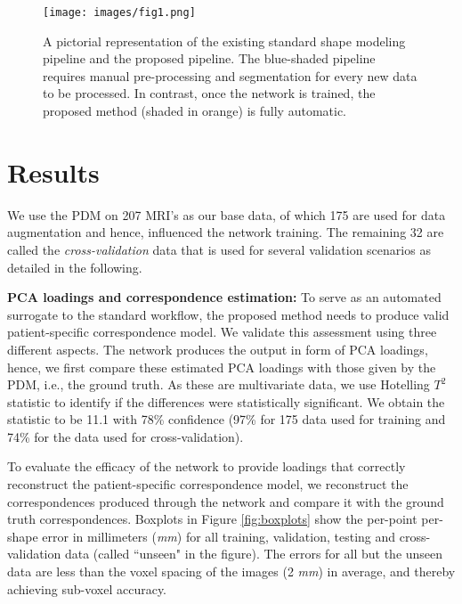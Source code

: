 \documentclass[twocolumn]{cinc}
\begin{document}
\begin{figure}[!h]
\centering
\texttt{[image: images/fig1.png]}
\vspace{-0.1in}
\caption{A pictorial representation of the existing standard shape modeling pipeline and the proposed pipeline. The blue-shaded pipeline requires manual pre-processing and segmentation for every new data to be processed. In contrast, once the network is trained, the proposed method (shaded in orange) is fully automatic.}
\vspace{-0.2in}
\label{fig:trainmodel}
\end{figure}


\vspace{-0.1in}
\section{Results}
\vspace{-0.1in}

We use the PDM on 207 MRI's as our base data, of which 175 are used for data augmentation and hence, influenced the network training. The remaining 32 are called the \emph{cross-validation} data that is used for several validation scenarios as detailed in the following.

\vspace{0.05in}
\noindent\textbf{PCA loadings and correspondence estimation: }
To serve as an automated surrogate to the standard workflow, the proposed method needs to produce valid patient-specific correspondence model. We validate this assessment using three different aspects. The network produces the output in form of PCA loadings, hence, we first compare these estimated PCA loadings with those given by the PDM, i.e., the ground truth. As these are multivariate data, we use Hotelling $T^2$ statistic to identify if the differences were statistically significant. We obtain the statistic to be 11.1 with 78\% confidence (97\% for 175 data used for training and 74\% for the data used for cross-validation). 

To evaluate the efficacy of the network to provide loadings that correctly reconstruct the patient-specific correspondence model, we reconstruct the correspondences produced through the network and compare it with the ground truth correspondences. Boxplots in Figure \ref{fig:boxplots} show the per-point per-shape error in millimeters (\textit{mm}) for all training, validation, testing and cross-validation data (called ``unseen" in the figure). The errors for all but the unseen data are less than the voxel spacing of the images (2 \textit{mm})  in average, and thereby achieving sub-voxel accuracy. 
\end{document}
